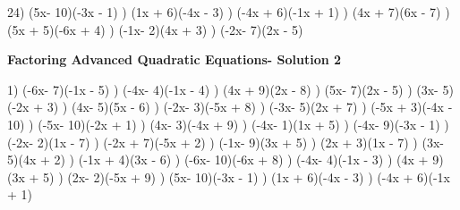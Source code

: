 \documentclass{article}%
\begin{document}
24) (5x- 10)(-3x - 1)%
) (1x + 6)(-4x - 3)%
) (-4x + 6)(-1x + 1)%
) (4x + 7)(6x - 7)%
) (5x + 5)(-6x + 4)%
) (-1x- 2)(4x + 3)%
) (-2x- 7)(2x - 5)%
\newline%
\newpage%
\large%
\begin{center}%
\textbf{Factoring Advanced Quadratic Equations- Solution 2}%
\newline%
\end{center} \normalsize%
1) (-6x- 7)(-1x - 5)%
) (-4x- 4)(-1x - 4)%
) (4x + 9)(2x - 8)%
) (5x- 7)(2x - 5)%
) (3x- 5)(-2x + 3)%
) (4x- 5)(5x - 6)%
) (-2x- 3)(-5x + 8)%
) (-3x- 5)(2x + 7)%
) (-5x + 3)(-4x - 10)%
) (-5x- 10)(-2x + 1)%
) (4x- 3)(-4x + 9)%
) (-4x- 1)(1x + 5)%
) (-4x- 9)(-3x - 1)%
) (-2x- 2)(1x - 7)%
) (-2x + 7)(-5x + 2)%
) (-1x- 9)(3x + 5)%
) (2x + 3)(1x - 7)%
) (3x- 5)(4x + 2)%
) (-1x + 4)(3x - 6)%
) (-6x- 10)(-6x + 8)%
) (-4x- 4)(-1x - 3)%
) (4x + 9)(3x + 5)%
) (2x- 2)(-5x + 9)%
) (5x- 10)(-3x - 1)%
) (1x + 6)(-4x - 3)%
) (-4x + 6)(-1x + 1)%
\newline%
\end{document}
